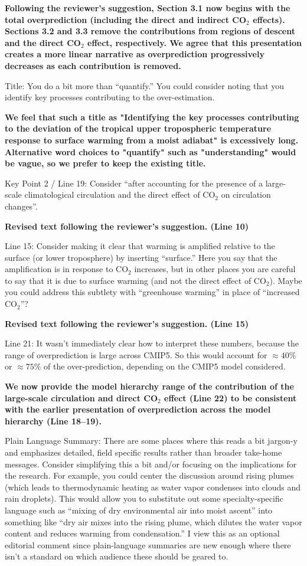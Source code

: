 \documentclass[11pt]{article}
\begin{document}
\textbf{Following the reviewer's suggestion, Section 3.1 now begins with the total overprediction (including the direct and indirect CO$_2$ effects). Sections 3.2 and 3.3 remove the contributions from regions of descent and the direct CO$_2$ effect, respectively. We agree that this presentation creates a more linear narrative as overprediction progressively decreases as each contribution is removed.}

Title: You do a bit more than ``quantify.'' You could consider noting that you identify key processes contributing to the over-estimation.

\textbf{We feel that such a title as "Identifying the key processes contributing to the deviation of the tropical upper tropospheric temperature response to surface warming from a moist adiabat" is excessively long. Alternative word choices to "quantify" such as "understanding" would be vague, so we prefer to keep the existing title.}

Key Point 2 / Line 19: Consider ``after accounting for the presence of a large-scale climatological circulation and the direct effect of CO\(_2\) on circulation changes''.

\textbf{Revised text following the reviewer's suggestion. (Line 10)}

Line 15: Consider making it clear that warming is amplified relative to the surface (or lower troposphere) by inserting ``surface.'' Here you say that the amplification is in response to CO\(_2\) increases, but in other places you are careful to say that it is due to surface warming (and not the direct effect of CO\(_2\)). Maybe you could address this subtlety with ``greenhouse warming'' in place of ``increased CO\(_2\)''?

\textbf{Revised text following the reviewer's suggestion. (Line 15)}

Line 21: It wasn't immediately clear how to interpret these numbers, because the range of overprediction is large across CMIP5. So this would account for \(\approx40\%\) or \(\approx75\%\) of the over-prediction, depending on the CMIP5 model considered.

\textbf{We now provide the model hierarchy range of the contribution of the large-scale circulation and direct CO$_2$ effect (Line 22) to be consistent with the earlier presentation of overprediction across the model hierarchy (Line 18--19).}

Plain Language Summary: There are some places where this reads a bit jargon-y and emphasizes detailed, field specific results rather than broader take-home messages. Consider simplifying this a bit and/or focusing on the implications for the research. For example, you could center the discussion around rising plumes (which leads to thermodynamic heating as water vapor condenses into clouds and rain droplets). This would allow you to substitute out some specialty-specific language such as ``mixing of dry environmental air into moist ascent'' into something like ``dry air mixes into the rising plume, which dilutes the water vapor content and reduces warming from condensation.'' I view this as an optional editorial comment since plain-language summaries are new enough where there isn't a standard on which audience these should be geared to.
\end{document}
